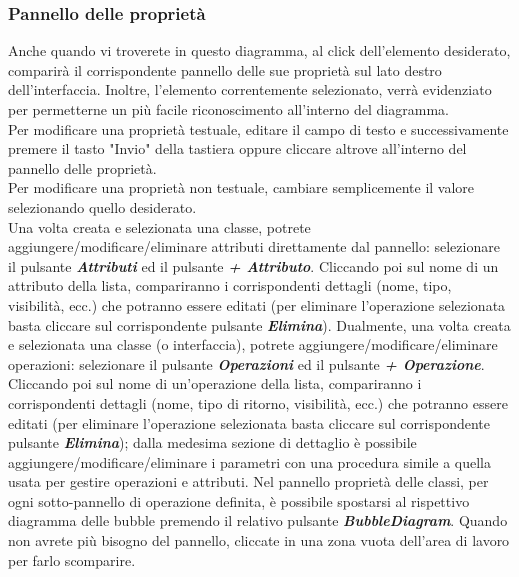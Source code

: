 \documentclass[../ManualeUtente.tex]{subfiles}
\begin{document}
			\subsubsection{Pannello delle proprietà}
				Anche quando vi troverete in questo diagramma, al click dell'elemento desiderato, comparirà il
				corrispondente pannello delle sue proprietà sul lato destro dell'interfaccia.
				Inoltre, l'elemento correntemente selezionato, verrà evidenziato per permetterne
				un più facile riconoscimento all'interno del diagramma.\\
				Per modificare una proprietà testuale, editare il campo di testo e successivamente premere il
				tasto "Invio" della tastiera oppure cliccare altrove all'interno del pannello delle proprietà.\\
				Per modificare una proprietà non testuale, cambiare semplicemente il valore selezionando quello
				desiderato.\\
				Una volta creata e selezionata una classe, potrete aggiungere/modificare/eliminare attributi direttamente
				dal pannello: selezionare il pulsante \textit{\textbf{Attributi}} ed il pulsante
				\textit{\textbf{+ Attributo}}. Cliccando poi sul nome di un attributo della lista, compariranno i
				corrispondenti dettagli (nome, tipo, visibilità, ecc.) che potranno essere editati (per eliminare
				l'operazione selezionata basta cliccare sul corrispondente pulsante
				\textit{\textbf{Elimina}}).
				Dualmente, una volta creata e selezionata una classe (o interfaccia), potrete
				aggiungere/modificare/eliminare operazioni: selezionare il pulsante \textit{\textbf{Operazioni}} ed il
				pulsante \textit{\textbf{+ Operazione}}. Cliccando poi sul nome di un'operazione della lista,
				compariranno i corrispondenti dettagli (nome, tipo di ritorno, visibilità, ecc.) che potranno essere
				editati (per eliminare l'operazione selezionata basta cliccare sul corrispondente pulsante
				\textit{\textbf{Elimina}}); dalla medesima sezione di dettaglio è possibile
				aggiungere/modificare/eliminare i parametri con una procedura simile a quella usata per gestire
				operazioni e attributi.
				Nel pannello proprietà delle classi, per ogni sotto-pannello di operazione definita,
				è possibile spostarsi al rispettivo diagramma delle bubble premendo il relativo pulsante
				\textit{\textbf{BubbleDiagram}}.
				Quando non avrete più bisogno del pannello, cliccate in una zona vuota dell'area di lavoro per farlo
				scomparire.
		\newpage
\end{document}
